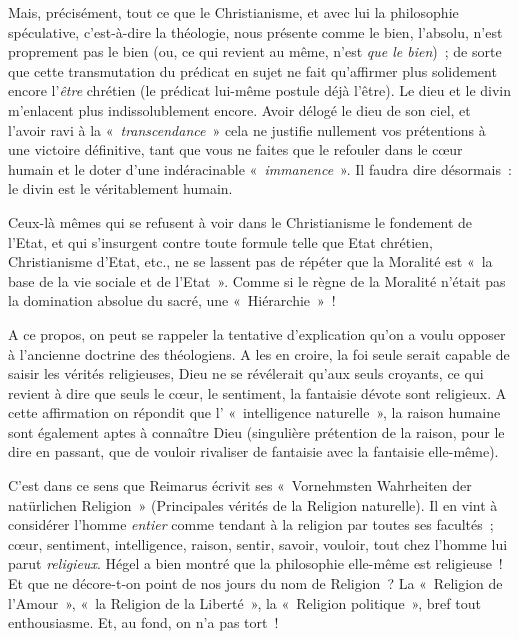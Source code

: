 \documentclass[french,twoside]{book} %
\begin{document}
Mais, précisément, tout ce que le Christianisme, et avec lui la philosophie spéculative, c’est-à-dire la théologie, nous présente comme le bien, l’absolu, n’est proprement pas le bien (ou, ce qui revient au même, n’est \emph{que le bien}) ; de sorte que cette transmutation du prédicat en sujet ne fait qu’affirmer plus solidement encore l’\emph{être} chrétien (le prédicat lui-même postule déjà l’être). Le dieu et le divin m’enlacent plus indissolublement encore. Avoir délogé le dieu de son ciel, et l’avoir ravi à la « \emph{transcendance} » cela ne justifie nullement vos prétentions à une victoire définitive, tant que vous ne faites que le refouler dans le cœur humain et le doter d’une indéracinable « \emph{immanence} ». Il faudra dire désormais : le divin est le véritablement humain.\par
Ceux-là mêmes qui se refusent à voir dans le Christianisme le fondement de l’Etat, et qui s’insurgent contre toute formule telle que Etat chrétien, Christianisme d’Etat, etc., ne se lassent pas de répéter que la Moralité est « la base de la vie sociale et de l’Etat ». Comme si le règne de la Moralité n’était pas la domination absolue du sacré, une « Hiérarchie » !\par
A ce propos, on peut se rappeler la tentative d’explication qu’on a voulu opposer à l’ancienne doctrine des théologiens. A les en croire, la foi seule serait capable de saisir les vérités religieuses, Dieu ne se révélerait qu’aux seuls croyants, ce qui revient à dire que seuls le cœur, le sentiment, la fantaisie dévote sont religieux. A cette affirmation on répondit que l’ « intelligence naturelle », la raison humaine sont également aptes à connaître Dieu (singulière prétention de la raison, pour le dire en passant, que de vouloir rivaliser de fantaisie avec la fantaisie elle-même).\par
 C’est dans ce sens que Reimarus écrivit ses « Vornehmsten Wahrheiten der natürlichen Religion » (Principales vérités de la Religion naturelle). Il en vint à considérer l’homme \emph{entier} comme tendant à la religion par toutes ses facultés ; cœur, sentiment, intelligence, raison, sentir, savoir, vouloir, tout chez l’homme lui parut \emph{religieux}. Hégel a bien montré que la philosophie elle-même est religieuse ! Et que ne décore-t-on point de nos jours du nom de Religion ? La « Religion de l’Amour », « la Religion de la Liberté », la « Religion politique », bref tout enthousiasme. Et, au fond, on n’a pas tort !\par
\end{document}
